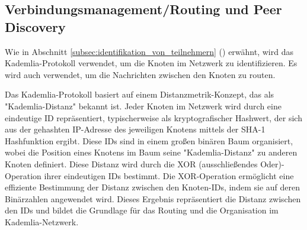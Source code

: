 \subsection{Verbindungsmanagement/Routing und Peer Discovery}
\label{subsec:routing}

Wie in Abschnitt \ref{subsec:identifikation_von_teilnehmern} 
() erwähnt,
wird das Kademlia-Protokoll verwendet, um die Knoten im Netzwerk zu identifizieren.
Es wird auch verwendet, um die Nachrichten zwischen den Knoten zu routen.




Das Kademlia-Protokoll basiert auf einem Distanzmetrik-Konzept, das als \\
"Kademlia-Distanz" bekannt ist. Jeder Knoten im Netzwerk wird durch eine eindeutige 
ID repräsentiert, 
typischerweise als kryptografischer Hashwert, der sich aus der gehashten IP-Adresse 
des jeweiligen Knotens mittels der SHA-1 Hashfunktion ergibt. Diese IDs sind in einem 
großen binären Baum organisiert, wobei die Position eines Knotens im Baum seine 
"Kademlia-Distanz" zu anderen Knoten definiert. Diese Distanz wird durch die XOR 
(ausschließendes Oder)-Operation ihrer eindeutigen IDs bestimmt. Die XOR-Operation 
ermöglicht eine effiziente Bestimmung der Distanz zwischen den Knoten-IDs, indem 
sie auf deren Binärzahlen angewendet wird. Dieses Ergebnis repräsentiert die 
Distanz zwischen den IDs und bildet die Grundlage für das Routing und die 
Organisation im Kademlia-Netzwerk.

